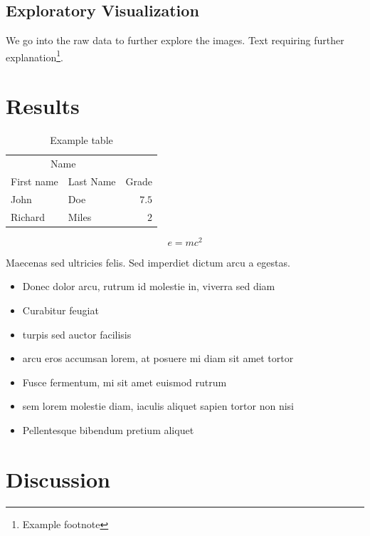 \documentclass[twoside, column]{article}
\begin{document}
\subsection{Exploratory Visualization}

We go into the raw data to further explore the images. 
Text requiring further explanation\footnote{Example footnote}.


\section{Results}

\begin{table}
\caption{Example table}
\centering
\begin{tabular}{llr}
\toprule
\multicolumn{2}{c}{Name} \\
\cmidrule(r){1-2}
First name & Last Name & Grade \\
\midrule
John & Doe & $7.5$ \\
Richard & Miles & $2$ \\
\bottomrule
\end{tabular}
\end{table}

\blindtext %

\begin{equation}
\label{eq:emc}
e = mc^2
\end{equation}

\blindtext %

Maecenas sed ultricies felis. Sed imperdiet dictum arcu a egestas. 
\begin{itemize}
\item Donec dolor arcu, rutrum id molestie in, viverra sed diam
\item Curabitur feugiat
\item turpis sed auctor facilisis
\item arcu eros accumsan lorem, at posuere mi diam sit amet tortor
\item Fusce fermentum, mi sit amet euismod rutrum
\item sem lorem molestie diam, iaculis aliquet sapien tortor non nisi
\item Pellentesque bibendum pretium aliquet
\end{itemize}
\blindtext %


\section{Discussion}
\end{document}
